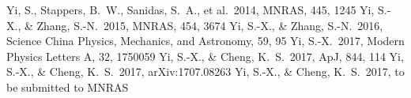 \documentclass{article}
\begin{document}
\begin{thebibliography}{99}
\footnotesize
{} Yi, S., Stappers, B.~W., Sanidas, S.~A., et al.\ 2014, MNRAS, 445, 1245
 Yi, S.-X., \& Zhang, S.-N.\ 2015, MNRAS, 454, 3674
 Yi, S.-X., \& Zhang, S.-N.\ 2016, Science China Physics, Mechanics, and Astronomy, 59, 95
 Yi, S.-X.\ 2017, Modern Physics Letters A, 32, 1750059
 Yi, S.-X., \& Cheng, K.~S.\ 2017, ApJ, 844, 114
 Yi, S.-X., \& Cheng, K.~S.\ 2017, arXiv:1707.08263
 Yi, S.-X., \& Cheng, K.~S.\ 2017, to be submitted to MNRAS
\end{thebibliography}
\end{document}
